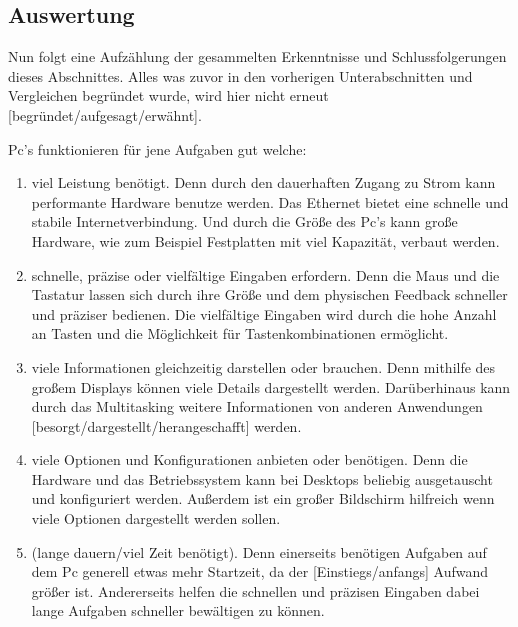 \subsection{Auswertung}\myTodo
Nun folgt eine Aufzählung der gesammelten Erkenntnisse und Schlussfolgerungen dieses Abschnittes. %
Alles was zuvor in den vorherigen Unterabschnitten und Vergleichen begründet wurde, wird hier nicht erneut [begründet/aufgesagt/erwähnt].%

\myNewSection
Pc's funktionieren für jene Aufgaben gut welche:
\begin{enumerate}%
	\item viel Leistung benötigt.\newline%
	Denn durch den dauerhaften Zugang zu Strom kann performante Hardware benutze werden. Das Ethernet bietet eine schnelle und stabile Internetverbindung. Und durch die Größe des Pc's kann große Hardware, wie zum Beispiel Festplatten mit viel Kapazität, verbaut werden.%
	\item schnelle, präzise oder vielfältige Eingaben erfordern.\newline%
	Denn die Maus und die Tastatur lassen sich durch ihre Größe und dem physischen Feedback schneller und präziser bedienen. Die vielfältige Eingaben wird durch die hohe Anzahl an Tasten und die Möglichkeit für Tastenkombinationen ermöglicht.%
	\item viele Informationen gleichzeitig darstellen oder brauchen.\newline%
	Denn mithilfe des großem Displays können viele Details dargestellt werden. Darüberhinaus kann durch das Multitasking weitere Informationen von anderen Anwendungen [besorgt/dargestellt/herangeschafft] werden.%
	\item viele Optionen und Konfigurationen anbieten oder benötigen.\newline%
	Denn die Hardware und das Betriebssystem kann bei Desktops beliebig ausgetauscht und konfiguriert werden. Außerdem ist ein großer Bildschirm hilfreich wenn viele Optionen dargestellt werden sollen.%
	\item (lange dauern/viel Zeit benötigt).\newline%
	Denn einerseits benötigen Aufgaben auf dem Pc generell etwas mehr Startzeit, da der [Einstiegs/anfangs] Aufwand größer ist. Andererseits helfen die schnellen und präzisen Eingaben dabei lange Aufgaben schneller bewältigen zu können.%
\end{enumerate}%
